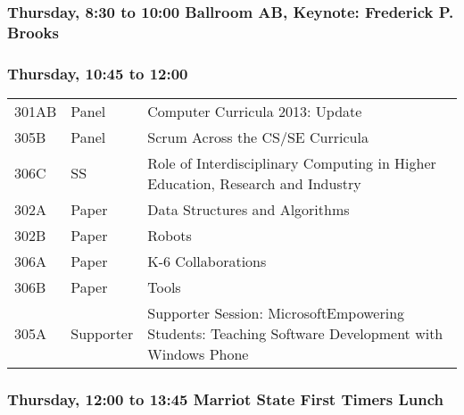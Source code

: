 
\subsubsection*{Thursday, 8:30 to 10:00 Ballroom AB, Keynote: Frederick P. Brooks}
\vspace{-0.5\baselineskip}
\subsubsection*{Thursday, 10:45 to 12:00}
\begin{tabular*}{5in}{@{}p{0.5in}@{}p{0.75in}@{}p{3.75in}}

301AB & Panel & Computer Curricula 2013:  Update \\

305B & Panel & Scrum Across the CS/SE Curricula \\

306C & SS & Role of Interdisciplinary Computing in Higher Education, Research and Industry \\

302A & Paper & Data Structures and Algorithms \\

302B & Paper & Robots \\

306A & Paper & K-6 Collaborations \\

306B & Paper & Tools \\

305A & Supporter & Supporter Session: MicrosoftEmpowering Students: Teaching Software Development with Windows Phone 
\end{tabular*}
\subsubsection*{Thursday, 12:00 to 13:45  Marriot State First Timers Lunch}

